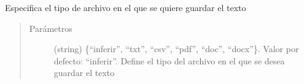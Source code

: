 \documentclass[letterpaper,10pt,openany,spanish]{sphinxmanual}
\begin{document}
\begin{fulllineitems}
\begin{fulllineitems}
\begin{quote}
\begin{description}
\end{description}\end{quote}

\end{fulllineitems}


\begin{fulllineitems}
\label{\detokenize{funciones/escritura:escritura.Escritor.texto_a_archivo}}
Especifica el tipo de archivo en el que se quiere guardar el texto
\begin{quote}\begin{description}
\item[{Parámetros}] \leavevmode
{} \textendash{} (string) \{“inferir”, “txt”, “csv”, “pdf”, “doc”, “docx”\}. Valor por defecto: “inferir”.             Define el tipo del archivo en el que se desea guardar el texto

\end{description}\end{quote}

\end{fulllineitems}


\end{fulllineitems}

\end{document}

